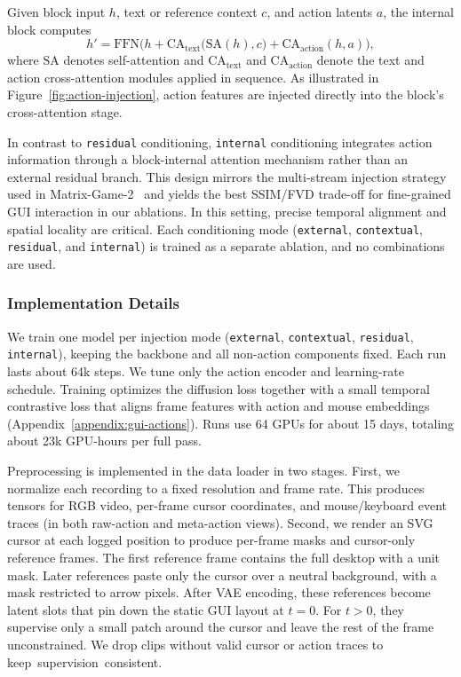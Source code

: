 Given block input $h$, text or reference context $c$, and action latents $a$, the internal block computes
\[
  h' = \mathrm{FFN}\Big(
    h + \mathrm{CA}_{\text{text}}\big(\mathrm{SA}(h), c\big)
      + \mathrm{CA}_{\text{action}}(h, a)
  \Big),
\]
where $\mathrm{SA}$ denotes self-attention and $\mathrm{CA}_{\text{text}}$ and $\mathrm{CA}_{\text{action}}$ denote the text and action cross-attention modules applied in sequence.
As illustrated in Figure~\ref{fig:action-injection}, action features are injected directly into the block’s cross-attention stage.

In contrast to \texttt{residual} conditioning, \texttt{internal} conditioning integrates action information through a block-internal attention mechanism rather than an external residual branch.
This design mirrors the multi-stream injection strategy used in Matrix-Game-2~\citep{he2025matrix} and yields the best SSIM/FVD trade-off for fine-grained GUI interaction in our ablations.
In this setting, precise temporal alignment and spatial locality are critical.
Each conditioning mode (\texttt{external}, \texttt{contextual}, \texttt{residual}, and \texttt{internal}) is trained as a separate ablation, and no combinations are used.


\subsubsection{Implementation Details}
We train one model per injection mode (\texttt{external}, \texttt{contextual}, \texttt{residual}, \texttt{internal}), keeping the backbone and all non-action components fixed.
Each run lasts about 64k steps.
We tune only the action encoder and learning-rate schedule.
Training optimizes the diffusion loss together with a small temporal contrastive loss that aligns frame features with action and mouse embeddings (Appendix~\ref{appendix:gui-actions}).
Runs use 64 GPUs for about 15 days, totaling about 23k GPU-hours per full pass.

Preprocessing is implemented in the data loader in two stages.
First, we normalize each recording to a fixed resolution and frame rate.
This produces tensors for RGB video, per-frame cursor coordinates, and mouse/keyboard event traces (in both raw-action and meta-action views).
Second, we render an SVG cursor at each logged position to produce per-frame masks and cursor-only reference frames.
The first reference frame contains the full desktop with a unit mask.
Later references paste only the cursor over a neutral background, with a mask restricted to arrow pixels.
After VAE encoding, these references become latent slots that pin down the static GUI layout at $t{=}0$.
For $t{>}0$, they supervise only a small patch around the cursor and leave the rest of the frame unconstrained.
We drop clips without valid cursor or action traces to keep~supervision~consistent.

